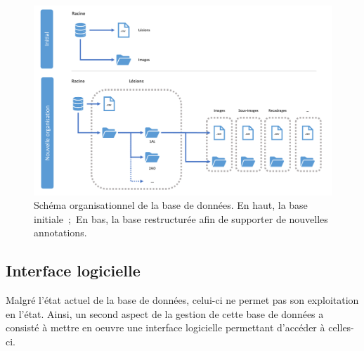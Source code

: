\begin{figure}[H]
    \centering
    \includegraphics[width=0.9\linewidth]{contents/chapter_4/resources/scheme_data_structure.pdf}
    \caption{Schéma organisationnel de la base de données. En haut, la base initiale~;~En bas, la base restructurée afin de supporter de nouvelles annotations.}
    \label{fig:db_structure}
\end{figure}\par
\clearpage

\subsection{Interface logicielle}
\label{sec:dataset_api}
Malgré l'état actuel de la base de données, celui-ci ne permet pas son exploitation en l'état. Ainsi, un second aspect de la gestion de cette base de données a consisté à mettre en oeuvre une interface logicielle permettant d'accéder à celles-ci.\par

